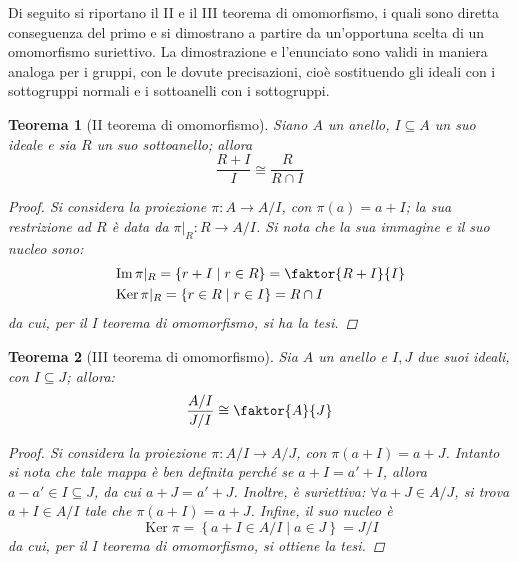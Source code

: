 \documentclass[12pt]{scrartcl}
\theoremstyle{style}
\newtheorem{teorema}{Teorema}[section]
\numberwithin{equation}{subsection}
\begin{document}
\noindent Di seguito si riportano il II e il III teorema di omomorfismo, i quali sono diretta conseguenza del primo e si dimostrano a partire da un'opportuna scelta di un omomorfismo suriettivo.
La dimostrazione e l'enunciato sono validi in maniera analoga per i gruppi, con le dovute precisazioni, cio\`e sostituendo gli ideali con i sottogruppi normali e i sottoanelli con i sottogruppi.
\begin{teorema}
	[II teorema di omomorfismo]
	Siano $A$ un anello, $I\subseteq A$ un suo ideale e sia $R$ un suo sottoanello; allora 
	\[
	\frac{R+I}{I}\cong \frac{R}{R\cap I}
	\] 
	\begin{proof}
		Si considera la proiezione $\pi : A \to A / I$, con $\pi(a) = a + I$; la sua restrizione ad $R$ \`e data da $\pi|_R : R \to A / I$.
		Si nota che la sua immagine e il suo nucleo sono: 
		\[
			\begin{split}
				&\operatorname{Im} \pi|_R = \left\{ r + I  \mid r \in R \right\} = \faktor{R+I}{I}\\
				&\operatorname{Ker} \pi|_R = \left\{ r \in R  \mid r \in I \right\}  = R \cap I 
			\end{split}
		\] 
		da cui, per il I teorema di omomorfismo, si ha la tesi.
	\end{proof}
\end{teorema}
\begin{teorema}
	[III teorema di omomorfismo]
	Sia $A $ un anello e $I,J$ due suoi ideali, con $I \subseteq J$; allora:
	\[
		\frac{A / I }{J / I}\cong \faktor{A}{J}
	\] 
	\begin{proof}
		Si considera la proiezione $\pi : A / I \to A / J$, con $\pi(a+ I) = a + J $.
	Intanto si nota che tale mappa \`e ben definita perch\'e se $a + I = a' + I$, allora $a-a' \in I \subseteq J$, da cui $a + J = a'+ J$.
Inoltre, \`e suriettiva: $\forall a + J \in A / J$, si trova $a +I \in A / I$ tale che $\pi(a+I) = a + J$.
Infine, il suo nucleo \`e 
\[
\operatorname{Ker} \pi = \left\{ a+ I \in A / I  \mid a \in J \right\} = J / I
\] 
da cui, per il I teorema di omomorfismo, si ottiene la tesi.
	\end{proof}
\end{teorema}
\end{document}
